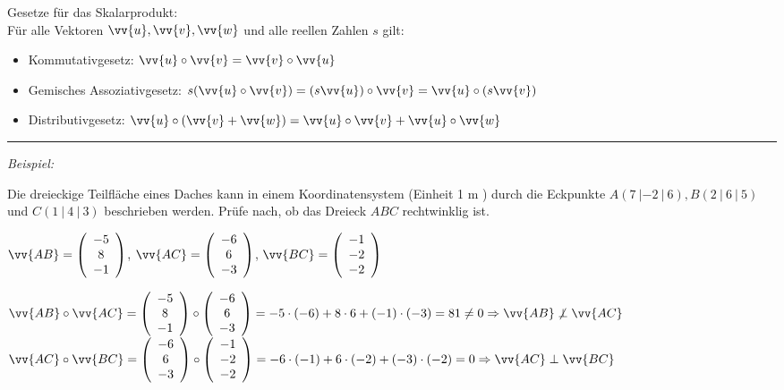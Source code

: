 Gesetze für das Skalarprodukt: \\
Für alle Vektoren $\vv{u}, \vv{v}, \vv{w}$ und alle reellen Zahlen $s$ gilt:
\begin{itemize}
    \item Kommutativgesetz: $\vv{u} \circ \vv{v} = \vv{v} \circ \vv{u}$ 
    \item Gemisches Assoziativgesetz: $s(\vv{u} \circ \vv{v}) = (s \vv{u}) \circ \vv{v} = \vv{u} \circ (s \vv{v})$
    \item Distributivgesetz: $\vv{u} \circ (\vv{v} + \vv{w}) = \vv{u} \circ \vv{v} + \vv{u} \circ \vv{w}$
\end{itemize}

\noindent\rule{\textwidth}{1pt}

\textit{Beispiel:}

Die dreieckige Teilfläche eines Daches kann in einem Koordinatensystem (Einheit 1 m ) durch die Eckpunkte $A(7 \ | -2 \ | \ 6), B(2 \ | \ 6 \ | \ 5)$ und $C(1 \ | \ 4\ | \ 3)$ beschrieben werden. Prüfe nach, ob das Dreieck $ABC$ rechtwinklig ist.

$\vv{AB} = \left(\begin{array}{c}  -5 \\ 8 \\ -1 \end{array}\right)$, $\vv{AC} = \left(\begin{array}{c}  -6 \\ 6 \\ -3 \end{array}\right)$, $\vv{BC} = \left(\begin{array}{c}  -1 \\ -2\\ -2 \end{array}\right)$


$\vv{AB} \circ \vv{AC} = \left(\begin{array}{c}  -5 \\ 8 \\ -1 \end{array}\right) \circ \left(\begin{array}{c}  -6 \\ 6 \\ -3 \end{array}\right) = -5 \cdot (-6) + 8 \cdot 6 + (-1) \cdot (-3) = 81 \neq 0 \Rightarrow \vv{AB} \not\perp \vv{AC} $
$\vv{AC} \circ \vv{BC} = \left(\begin{array}{c}  -6 \\ 6 \\ -3 \end{array}\right) \circ \left(\begin{array}{c}  -1 \\ -2\\ -2 \end{array}\right) = -6 \cdot (-1) + 6 \cdot (-2) + (-3) \cdot (-2) = 0 \Rightarrow \vv{AC} \perp \vv{BC}$

